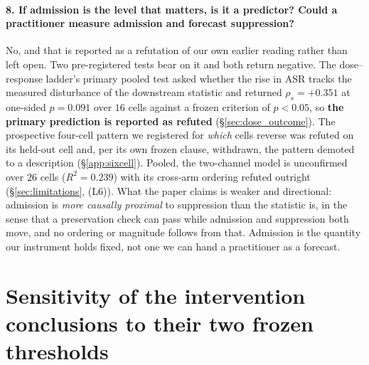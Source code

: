 \documentclass{article}
\begin{document}
\paragraph{8. If admission is the level that matters, is it a predictor? Could a practitioner measure
admission and forecast suppression?} No, and that is reported as a refutation of our own earlier reading
rather than left open. Two pre-registered tests bear on it and both return negative. The dose--response
ladder's primary pooled test asked whether the rise in ASR tracks the measured disturbance of the
downstream statistic and returned $\rho_s = +0.351$ at one-sided $p = 0.091$ over $16$ cells against a
frozen criterion of $p < 0.05$, so \textbf{the primary prediction is reported as refuted}
(§\ref{sec:dose_outcome}). The prospective four-cell pattern we registered for \emph{which} cells reverse
was refuted on its held-out cell and, per its own frozen clause, withdrawn, the pattern demoted to a
description (§\ref{app:sixcell}). Pooled, the two-channel model is unconfirmed over $26$ cells
($R^2 = 0.239$) with its cross-arm ordering refuted outright (§\ref{sec:limitations}, (L6)). What the paper
claims is weaker and directional: admission is \emph{more causally proximal} to suppression than the
statistic is, in the sense that a preservation check can pass while admission and suppression both move,
and no ordering or magnitude follows from that. Admission is the quantity our instrument holds fixed, not
one we can hand a practitioner as a forecast.

\section{Sensitivity of the intervention conclusions to their two frozen thresholds}
\label{app:sensitivity}
\end{document}

